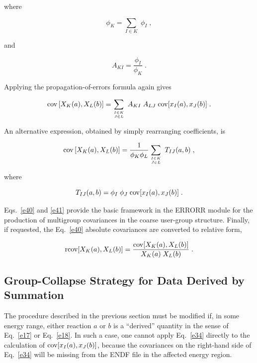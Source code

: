 \noindent
where

\begin{equation}
\phi_K = \sum_{I\in K} \;\phi_I \;,
\end{equation}

\noindent
and

\begin{equation}
A_{KI} = \frac{\phi_I}{\phi_K}\;.
\end{equation}

\noindent
Applying the propagation-of-errors formula again gives

\begin{equation}
{\rm cov} \left[X_K(a),X_L(b) \right] = \sum_{I\in K\atop{J\in L}}\;
  A_{KI}\;A_{LJ}\;{\rm {\rm cov}}[x_I(a),x_J(b)] \;.
\label{e39}
\end{equation}

\noindent
An alternative expression, obtained by simply rearranging coefficients, is

\begin{equation}
{\rm {\rm cov}} \left[X_K(a),X_L(b) \right] =
  \frac{1}{\phi_K \phi_L} \sum_{I\in K\atop{J\in L}} \; T_{IJ}(a,b) \; ,
\label{e40}
\end{equation}

\noindent
where

\begin{equation}
T_{IJ}(a,b) = \phi_I\;\phi_J \; {\rm cov} [x_I(a),x_J(b)]\;.
\label{e41}
\end{equation}
\vspace{1 pt}

\noindent
Eqs.~\ref{e40} and \ref{e41} provide the basic framework in the ERRORR
module for the production of multigroup covariances in the coarse user-group
structure.  Finally, if requested, the Eq.~\ref{e40} absolute covariances
are converted to relative form,

\begin{equation}
{\rm r{\rm cov}} [X_K(a),X_L(b)] =
  \frac{{\rm cov} [X_K(a),X_L(b)]}{X_K(a)\;X_L(b)} \;.
\label{e42}
\end{equation}

\subsection{Group-Collapse Strategy for Data Derived by Summation}
\label{ssERRORR_summ}

The procedure described in the previous section must be modified if, in
some energy range, either reaction $a$ or $b$ is a ``derived'' quantity
in the sense of Eq.~\ref{e17} or Eq.~\ref{e18}.  In such a case, one
cannot apply Eq.~\ref{e34} directly to the calculation of
${\rm {\rm cov}}[x_I (a),x_J(b)]$, because the covariances on the
right-hand side of Eq.~\ref{e34} will be missing from the ENDF file in
the affected energy region.

